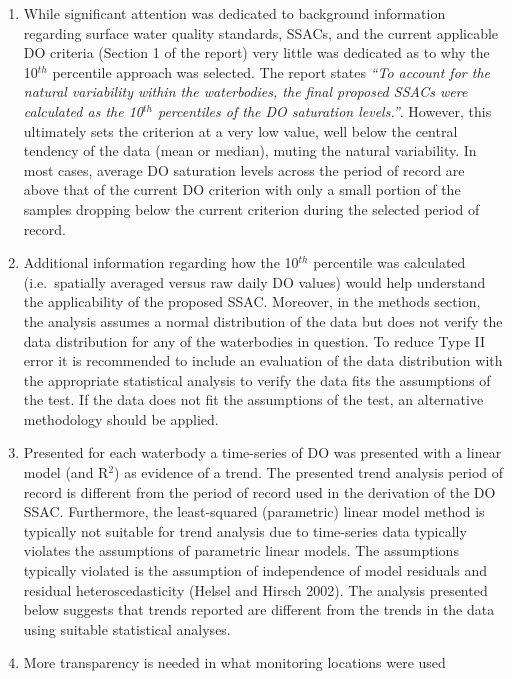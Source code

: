 \documentclass[]{interact}
\theoremstyle{plain}%
\theoremstyle{definition}
\theoremstyle{remark}
\begin{document}
\begin{enumerate}
\def\labelenumi{\arabic{enumi}.}
\item
  While significant attention was dedicated to background information
  regarding surface water quality standards, SSACs, and the current
  applicable DO criteria (Section 1 of the report) very little was
  dedicated as to why the 10\(^{th}\) percentile approach was selected.
  The report states \emph{``To account for the natural variability
  within the waterbodies, the final proposed SSACs were calculated as
  the 10\(^{th}\) percentiles of the DO saturation levels.''}. However,
  this ultimately sets the criterion at a very low value, well below the
  central tendency of the data (mean or median), muting the natural
  variability. In most cases, average DO saturation levels across the
  period of record are above that of the current DO criterion with only
  a small portion of the samples dropping below the current criterion
  during the selected period of record.
\item
  Additional information regarding how the 10\(^{th}\) percentile was
  calculated (i.e.~spatially averaged versus raw daily DO values) would
  help understand the applicability of the proposed SSAC. Moreover, in
  the methods section, the analysis assumes a normal distribution of the
  data but does not verify the data distribution for any of the
  waterbodies in question. To reduce Type II error it is recommended to
  include an evaluation of the data distribution with the appropriate
  statistical analysis to verify the data fits the assumptions of the
  test. If the data does not fit the assumptions of the test, an
  alternative methodology should be applied.
\item
  Presented for each waterbody a time-series of DO was presented with a
  linear model (and R\(^{2}\)) as evidence of a trend. The presented
  trend analysis period of record is different from the period of record
  used in the derivation of the DO SSAC. Furthermore, the least-squared
  (parametric) linear model method is typically not suitable for trend
  analysis due to time-series data typically violates the assumptions of
  parametric linear models. The assumptions typically violated is the
  assumption of independence of model residuals and residual
  heteroscedasticity (Helsel and Hirsch 2002). The analysis presented
  below suggests that trends reported are different from the trends in
  the data using suitable statistical analyses.
\item
  More transparency is needed in what monitoring locations were used

\end{enumerate}
\end{document}
